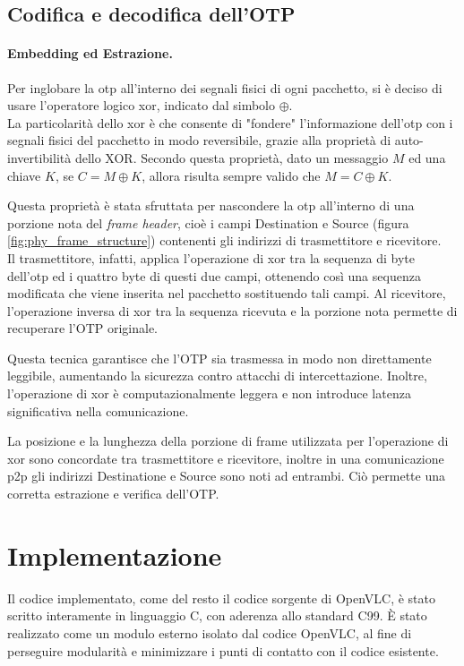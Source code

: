 \subsection{Codifica e decodifica dell'OTP}

\paragraph{Embedding ed Estrazione.}
Per inglobare la \gls{otp} all'interno dei segnali fisici di ogni pacchetto, si è deciso di usare l'operatore logico \gls{xor}\glsfirstoccur, indicato dal simbolo \(\oplus\).\\
La particolarità dello \gls{xor} è che consente di "fondere" l'informazione dell'\gls{otp} con i segnali fisici del pacchetto in modo reversibile, grazie alla proprietà di auto-invertibilità dello XOR. Secondo questa proprietà, dato un messaggio \( M \) ed una chiave \( K \), se \( C = M \oplus K \), allora risulta sempre valido che \( M = C \oplus K \).

Questa proprietà è stata sfruttata per nascondere la \gls{otp} all'interno di una porzione nota del \textit{frame header}, cioè i campi Destination e Source (figura \ref{fig:phy_frame_structure}) contenenti gli indirizzi di trasmettitore e ricevitore.\\
Il trasmettitore, infatti, applica l'operazione di \gls{xor} tra la sequenza di byte dell'\gls{otp} ed i quattro byte di questi due campi, ottenendo così una sequenza modificata che viene inserita nel pacchetto sostituendo tali campi. Al ricevitore, l'operazione inversa di \gls{xor} tra la sequenza ricevuta e la porzione nota permette di recuperare l'OTP originale.

Questa tecnica garantisce che l'OTP sia trasmessa in modo non direttamente leggibile, aumentando la sicurezza contro attacchi di intercettazione. Inoltre, l'operazione di \gls{xor} è computazionalmente leggera e non introduce latenza significativa nella comunicazione.

La posizione e la lunghezza della porzione di frame utilizzata per l'operazione di \gls{xor} sono concordate tra trasmettitore e ricevitore, inoltre in una comunicazione \gls{p2p} gli indirizzi Destinatione e Source sono noti ad entrambi. Ciò permette una corretta estrazione e verifica dell'OTP.


\section{Implementazione}
Il codice implementato, come del resto il codice sorgente di OpenVLC, è stato scritto interamente in linguaggio C, con aderenza allo standard C99. È stato realizzato come un modulo esterno isolato dal codice OpenVLC, al fine di perseguire modularità e minimizzare i punti di contatto con il codice esistente.

